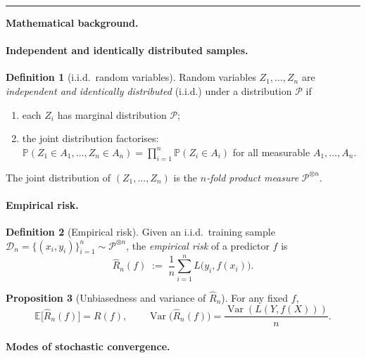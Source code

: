 \documentclass[11pt]{article}
\theoremstyle{definition}
\newtheorem{definition}{Definition}
\newtheorem{proposition}[definition]{Proposition}
\begin{document}
\bigskip
\hrule
\bigskip

\noindent\textbf{Mathematical background.}

\paragraph{Independent and identically distributed samples.}

\begin{definition}[i.i.d.\ random variables]
Random variables $Z_{1}, \dots, Z_{n}$ are \emph{independent and identically
distributed} (i.i.d.) under a distribution $\mathcal{P}$ if
\begin{enumerate}[label=(\roman*), leftmargin=2em]
  \item each $Z_{i}$ has marginal distribution $\mathcal{P}$;
  \item the joint distribution factorises:
        $\mathbb{P}(Z_{1} \in A_{1}, \dots, Z_{n} \in A_{n})
        = \prod_{i=1}^{n} \mathbb{P}(Z_{i} \in A_{i})$ for all measurable
        $A_{1}, \dots, A_{n}$.
\end{enumerate}
The joint distribution of $(Z_{1}, \dots, Z_{n})$ is the
\emph{$n$-fold product measure} $\mathcal{P}^{\otimes n}$.
\end{definition}

\paragraph{Empirical risk.}

\begin{definition}[Empirical risk]
Given an i.i.d.\ training sample
$\mathcal{D}_n = \{(x_i, y_i)\}_{i=1}^{n} \sim \mathcal{P}^{\otimes n}$, the
\emph{empirical risk} of a predictor $f$ is
\[
  \widehat{R}_n(f) \;:=\; \frac{1}{n} \sum_{i=1}^{n} L\bigl(y_i, f(x_i)\bigr).
\]
\end{definition}

\begin{proposition}[Unbiasedness and variance of $\widehat{R}_n$]
For any fixed $f$,
\[
  \mathbb{E}\bigl[\widehat{R}_n(f)\bigr] = R(f),
  \qquad
  \operatorname{Var}\bigl(\widehat{R}_n(f)\bigr) = \frac{\operatorname{Var}(L(Y, f(X)))}{n}.
\]
\end{proposition}

\paragraph{Modes of stochastic convergence.}
\end{document}
